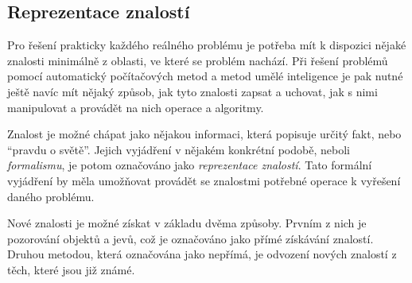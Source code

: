 \subsection{Reprezentace znalostí}
Pro řešení prakticky každého reálného problému je potřeba mít k dispozici nějaké znalosti minimálně z oblasti, ve které se problém nachází.
Při řešení problémů pomocí automatický počítačových metod a metod umělé inteligence je pak nutné ještě navíc
mít nějaký způsob, jak tyto znalosti zapsat a uchovat, jak s nimi manipulovat a provádět na nich operace a algoritmy.

Znalost je možné chápat jako nějakou informaci, která popisuje určitý fakt, nebo \enquote{pravdu o světě}.
Jejich vyjádření v nějakém konkrétní podobě, neboli \emph{formalismu}, je potom označováno jako \emph{reprezentace znalostí}.
Tato formální vyjádření by měla umožňovat provádět se znalostmi potřebné operace k vyřešení daného problému.~\cite{prepreze_znal}

Nové znalosti je možné získat v základu dvěma způsoby.
Prvním z nich je pozorování objektů a jevů, což je označováno jako přímé získávání znalostí.
Druhou metodou, která označována jako nepřímá, je odvození nových znalostí z těch, které jsou již známé.~\cite{prepreze_znal}

